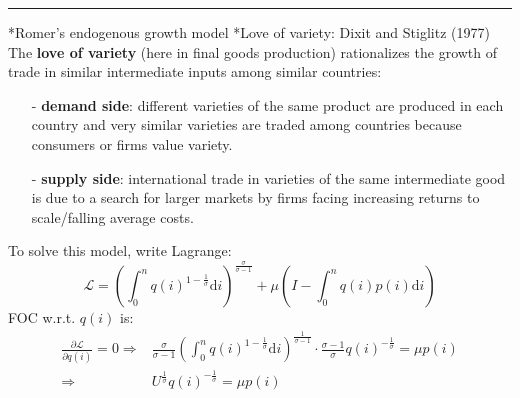 \documentclass[10pt,landscape,a4paper]{article}
\makeatletter
\renewcommand{\section}{\@startsection{section}{1}{0mm}{1ex}{.2ex}{\normalsize\bfseries}}
\renewcommand{\subsection}{\@startsection{subsection}{1}{0mm}{.2ex}{.2ex}{\small\bfseries}}
\makeatother
\begin{document}
\begin{multicols*}{3}
\rule{0.325\textwidth}{0.4pt}


\section*{Romer's endogenous growth model}
\subsection*{Love of variety: Dixit and Stiglitz (1977)}
The \textbf{love of variety} (here in final goods production) rationalizes the growth of trade in similar intermediate inputs among similar countries: 

\begin{itemize}
    \item[-]\textbf{{\color{myblue}demand side}}: different varieties of the same product are produced in each country and very similar varieties are traded among countries because consumers or firms value variety.
    \item[-]\textbf{{\color{myblue}supply side}}: international trade in varieties of the same intermediate good is due to a search for larger markets by firms facing increasing returns to scale/falling average costs.
\end{itemize}

\vspace{2pt}

\vspace{2pt}
To solve this model, write Lagrange:
$$
\mathcal{L} = \left(\int^n_0 q(i)^{1-\frac{1}{\sigma}}\mathrm{d}i\right)^{\frac{\sigma}{\sigma-1}}+\mu\left( I-\int^n_0q(i)p(i)\mathrm{d}i\right)
$$
FOC w.r.t. $q(i)$ is:
\begin{align*}
    \frac{\partial\mathcal{L}}{\partial q(i)}=0\Rightarrow & \frac{\sigma}{\sigma-1} \left(\int^n_0 q(i)^{1-\frac{1}{\sigma}}\mathrm{d}i\right)^{\frac{1}{\sigma-1}}\cdot\frac{\sigma-1}{\sigma}q(i)^{-\frac{1}{\sigma}}=\mu p(i)\\
    \Rightarrow & U^{\frac{1}{\sigma}}q(i)^{-\frac{1}{\sigma}}=\mu p(i)
\end{align*}


\end{multicols*}
\end{document}
